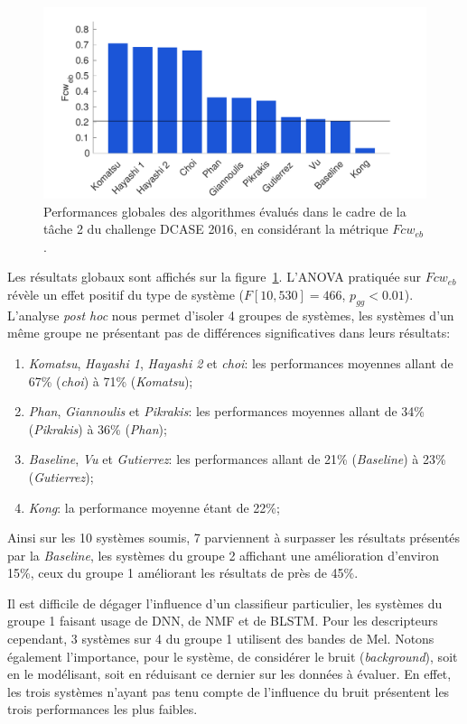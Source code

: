 \begin{figure}[t]
\includegraphics[width=1\textwidth]{gfx/ch_7/results_overall_eb_class_wise_average_F_6}
\caption{Performances globales des algorithmes évalués dans le cadre de la tâche 2 du challenge DCASE 2016, en considérant la métrique $Fcw_{eb}$.}
\label{fig:overall_eb_class_wise_F}
\end{figure}

Les résultats globaux sont affichés sur la figure~\ref{fig:overall_eb_class_wise_F}. L'ANOVA pratiquée sur $Fcw_{eb}$ révèle un effet positif du type de système ($F[10,530]=466$, $p_{gg}<0.01$). L'analyse \emph{post hoc} nous permet d'isoler 4 groupes de systèmes, les systèmes d'un même groupe ne présentant pas de différences significatives dans leurs résultats:

\begin{enumerate}
\item \emph{Komatsu}, \emph{Hayashi 1}, \emph{Hayashi 2} et \emph{choi}: les performances moyennes allant de 67\% (\emph{choi}) à 71\% (\emph{Komatsu});
\item \emph{Phan}, \emph{Giannoulis} et \emph{Pikrakis}: les performances moyennes allant de 34\% (\emph{Pikrakis}) à 36\% (\emph{Phan});
\item \emph{Baseline}, \emph{Vu} et \emph{Gutierrez}: les performances allant de 21\% (\emph{Baseline}) à 23\% (\emph{Gutierrez});
\item \emph{Kong}: la performance moyenne étant de 22\%;
\end{enumerate}

Ainsi sur les 10 systèmes soumis, 7 parviennent à surpasser les résultats présentés par la \emph{Baseline}, les systèmes du groupe 2 affichant une amélioration d'environ 15\%, ceux du groupe 1 améliorant les résultats de près de 45\%.

Il est difficile de dégager l'influence d'un classifieur particulier, les systèmes du groupe 1 faisant usage de DNN, de NMF et de BLSTM. Pour les descripteurs cependant, 3 systèmes sur 4 du groupe 1 utilisent des bandes de Mel. Notons également l'importance, pour le système, de considérer le bruit (\emph{background}), soit en le modélisant, soit en réduisant ce dernier sur les données à évaluer. En effet, les trois systèmes n'ayant pas tenu compte de l'influence du bruit présentent les trois performances les plus faibles.


